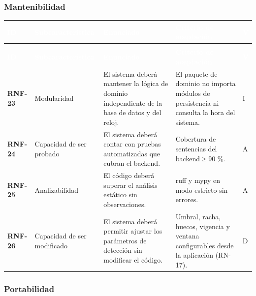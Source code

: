 \documentclass[11pt,a4paper,oneside]{article}
\begin{document}
\subsubsection{Mantenibilidad}

{\footnotesize
\begin{xltabular}{\textwidth}{@{}>{\sffamily\bfseries}p{1.45cm}>{\raggedright\arraybackslash}p{2.4cm}YY>{\raggedright\arraybackslash}p{0.45cm}@{}}
\textcolor{white}{\sffamily\bfseries\footnotesize ID} & \textcolor{white}{\sffamily\bfseries\footnotesize Subcaracterística} & \textcolor{white}{\sffamily\bfseries\footnotesize Enunciado} & \textcolor{white}{\sffamily\bfseries\footnotesize Criterio de aceptación} & \textcolor{white}{\sffamily\bfseries\footnotesize V}\\
\endfirsthead
{}\\
\textcolor{white}{\sffamily\bfseries\footnotesize ID} & \textcolor{white}{\sffamily\bfseries\footnotesize Subcaracterística} & \textcolor{white}{\sffamily\bfseries\footnotesize Enunciado} & \textcolor{white}{\sffamily\bfseries\footnotesize Criterio de aceptación} & \textcolor{white}{\sffamily\bfseries\footnotesize V}\\
\endhead
RNF-23 & Modularidad & El sistema deberá mantener la lógica de dominio independiente de la base de datos y del reloj. & El paquete de dominio no importa módulos de persistencia ni consulta la hora del sistema. & I\\ \hline
{}RNF-24 & Capacidad de ser probado & El sistema deberá contar con pruebas automatizadas que cubran el backend. & Cobertura de sentencias del backend ≥ 90 \%. & A\\ \hline
RNF-25 & Analizabilidad & El código deberá superar el análisis estático sin observaciones. & ruff y mypy en modo estricto sin errores. & A\\ \hline
{}RNF-26 & Capacidad de ser modificado & El sistema deberá permitir ajustar los parámetros de detección sin modificar el código. & Umbral, racha, huecos, vigencia y ventana configurables desde la aplicación (RN-17). & D\\ \hline
\end{xltabular}}
\vspace{0.6em}

\subsubsection{Portabilidad}
\end{document}
